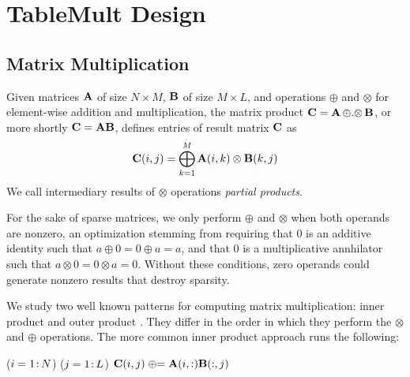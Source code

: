 
\section{TableMult Design}
\label{sDesign}


\subsection{Matrix Multiplication}
\label{sMatMul}
Given matrices $\mathbf{A}$ of size $N \times M$, $\mathbf{B}$ of size $M \times L$,
and operations $\oplus$ and $\otimes$ for element-wise addition and multiplication,
the matrix product $\mathbf{C} = \mathbf{A} \,{\oplus}.{\otimes}\, \mathbf{B} $, or more shortly $\mathbf{C} = \mathbf{A}\mathbf{B}$,
defines entries of result matrix $\mathbf{C}$ as 
\[ \mathbf{C}(i,j) = \bigoplus_{k=1}^M \mathbf{A}(i,k) \otimes \mathbf{B}(k,j) \]
We call intermediary results of $\otimes$ operations \emph{partial products}.

For the sake of sparse matrices, we only perform $\oplus$ and $\otimes$ when both operands are nonzero,
an optimization stemming from requiring that 0 is an additive identity such that $a \oplus 0 = 0 \oplus a = a$,
and that 0 is a multiplicative annhilator such that $a \otimes 0 = 0 \otimes a = 0$.
Without these conditions, zero operands could generate nonzero results that destroy sparsity.



We study two well known patterns for computing matrix multiplication:
inner product and outer product \cite{kruskal1989techniques}. They differ in the order in which they perform
the $\otimes$ and $\oplus$ operations.  The more common inner product approach runs the following: %

\removelatexerror
\begin{algorithm}[H]
\vspace{\algspace}
\fore($i = 1\colon\! N$){
\fore($j = 1\colon\! L$){
{$\mathbf{C}(i,j) \mathrel{\oplus}= \mathbf{A}(i,:)  \mathbf{B}(:,j)$}
}}
\vspace{\algspace}
\end{algorithm}

